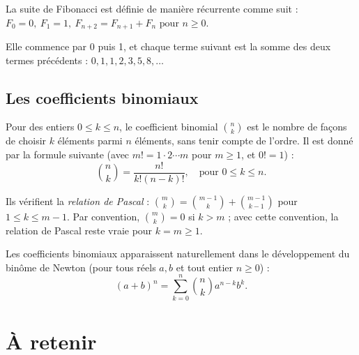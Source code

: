 \documentclass[11pt]{article}
\begin{document}
\begin{definition}\label{def:fibonacci}
La suite de Fibonacci est définie de manière récurrente comme suit :
\(
    F_0 = 0, \ F_1 = 1, \ F_{n+2} = F_{n+1} + F_n \text{ pour } n \geq 0.
\)
\end{definition}

Elle commence par 0 puis 1, et chaque terme suivant est la somme des deux termes précédents :
\(0, 1, 1, 2, 3, 5, 8, \ldots\)

\subsection{Les coefficients binomiaux}\label{sec:binomiaux}

\begin{definition}\label{def:binomial}
Pour des entiers \(0 \leq k \leq n\), le coefficient binomial \(\displaystyle \binom{n}{k}\) est le nombre de façons de choisir \(k\) éléments parmi \(n\) éléments, sans tenir compte de l'ordre. Il est donné par la formule suivante (avec \(m! = 1 \cdot 2 \cdots m\) pour \(m \geq 1\), et \(0! = 1\)) :
\[
    \binom{n}{k} = \frac{n!}{k!(n-k)!}, \quad \text{pour } 0 \leq k \leq n.
\]
\end{definition}

\begin{proposition}\label{prop:pascal}
Ils vérifient la \emph{relation de Pascal} : \(\displaystyle\binom{m}{k} = \binom{m-1}{k} + \binom{m-1}{k-1}\) pour \(1 \leq k \leq m-1\). Par convention, \(\binom{m}{k} = 0\) si \(k > m\) ; avec cette convention, la relation de Pascal reste vraie pour \(k = m \geq 1\).
\end{proposition}

\begin{theoreme}\label{thm:newton}
Les coefficients binomiaux apparaissent naturellement dans le développement du binôme de Newton (pour tous réels \(a, b\) et tout entier \(n \geq 0\)) :
\[
    (a + b)^n = \sum_{k=0}^n \binom{n}{k} a^{n-k} b^k.
\]
\end{theoreme}

\section{À retenir}\label{sec:retenir}
\end{document}

